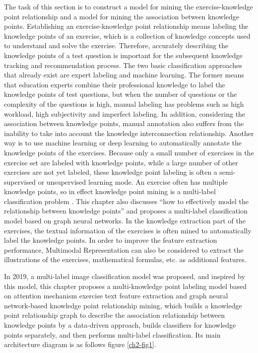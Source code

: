 The task of this section is to construct a model for mining the exercise-knowledge point relationship and a model for mining the association between knowledge points. Establishing an exercise-knowledge point relationship means labeling the knowledge points of an exercise, which is a collection of knowledge concepts used to understand and solve the exercise. Therefore, accurately describing the knowledge points of a test question is important for the subsequent knowledge tracking and recommendation process. The two basic classification approaches that already exist are expert labeling and machine learning. The former means that education experts combine their professional knowledge to label the knowledge points of test questions, but when the number of questions or the complexity of the questions is high, manual labeling has problems such as high workload, high subjectivity and imperfect labeling. In addition, considering the association between knowledge points, manual annotation also suffers from the inability to take into account the knowledge interconnection relationship. Another way is to use machine learning or deep learning to automatically annotate the knowledge points of the exercises. Because only a small number of exercises in the exercise set are labeled with knowledge points, while a large number of other exercises are not yet labeled, these knowledge point labeling is often a semi-supervised or unsupervised learning mode. An exercise often has multiple knowledge points, so in effect knowledge point mining is a multi-label classification problem \cite{tsoumakas2007multi,zhang2013review,liu2020emerging}. This chapter also discusses ``how to effectively model the relationship between knowledge points'' and proposes a multi-label classification model based on graph neural networks. In the knowledge extraction part of the exercises, the textual information of the exercises is often mined to automatically label the knowledge points. In order to improve the feature extraction performance, Multimodal Representation \cite{guo2019deep} can also be considered to extract the illustrations of the exercises, mathematical formulas, etc. as additional features.

In 2019, a multi-label image classification model was proposed\cite{chen2019multi}, and inspired by this model, this chapter proposes a multi-knowledge point labeling model based on attention mechanism exercise text feature extraction and graph neural network-based knowledge point relationship mining, which builds a knowledge point relationship graph to describe the association relationship between knowledge points by a data-driven approach, builds classifiers for knowledge points separately, and then performs multi-label classification. Its main architecture diagram is as follows figure \ref{ch2-fig1}.

